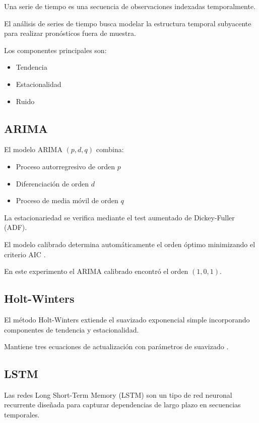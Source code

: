 \documentclass[12pt]{article}
\begin{document}
Una serie de tiempo es una secuencia de observaciones indexadas temporalmente.

El análisis de series de tiempo busca modelar la estructura temporal subyacente para realizar pronósticos fuera de muestra.

Los componentes principales son:

\begin{itemize}
\item Tendencia
\item Estacionalidad
\item Ruido
\end{itemize}

\cite{hyndman2018forecasting}

\subsection{ARIMA}

El modelo ARIMA $(p,d,q)$ combina:

\begin{itemize}
\item Proceso autorregresivo de orden $p$
\item Diferenciación de orden $d$
\item Proceso de media móvil de orden $q$
\end{itemize}

La estacionariedad se verifica mediante el test aumentado de Dickey-Fuller (ADF).

El modelo calibrado determina automáticamente el orden óptimo minimizando el criterio AIC \cite{box2015time}.

En este experimento el ARIMA calibrado encontró el orden $(1,0,1)$.

\subsection{Holt-Winters}

El método Holt-Winters extiende el suavizado exponencial simple incorporando componentes de tendencia y estacionalidad.

Mantiene tres ecuaciones de actualización con parámetros de suavizado \cite{winters1960forecasting}.

\subsection{LSTM}

Las redes Long Short-Term Memory (LSTM) son un tipo de red neuronal recurrente diseñada para capturar dependencias de largo plazo en secuencias temporales.
\end{document}
